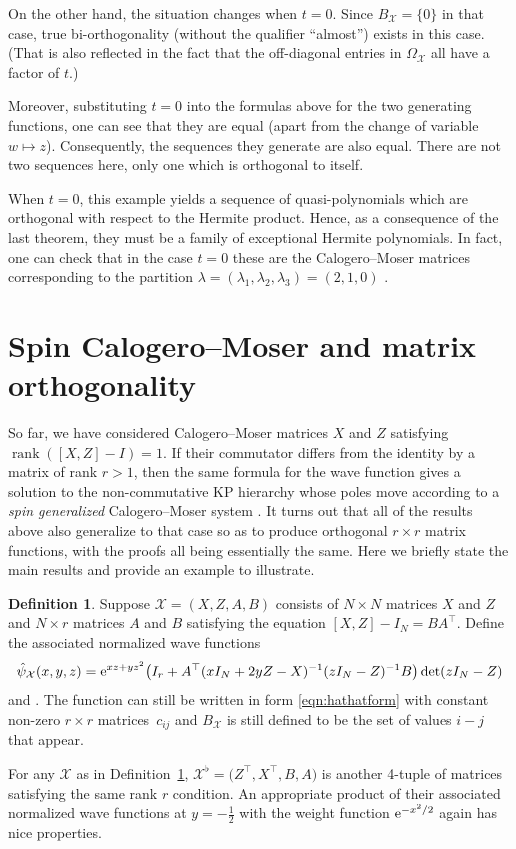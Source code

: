 \documentclass[pdftex]{sigma}
\numberwithin{equation}{section}
\theoremstyle{definition}
\newtheorem{Definition}[Theorem]{Definition}
\def\X{\mathcal{X}}
\begin{document}
On the other hand, the situation changes when $t=0$. Since
$B_{\X}=\{0\}$ in that case,
 true bi-orthogonality (without the qualifier ``almost'') exists
in this case. (That is also reflected in the fact that the
off-diagonal entries in $\Omega_{\X}$ all have a factor of $t$.)

Moreover, substituting $t=0$ into the formulas above for the two
generating functions, one can see that they are equal
(apart from the change of variable $w\mapsto z$). Consequently, the
sequences they generate are also equal. There are not two sequences
here, only one which is orthogonal to itself.

When $t=0$, this example yields a sequence of quasi-polynomials which are
orthogonal with respect to the Hermite product.
Hence, as a consequence of the last theorem, they must be a family of exceptional Hermite polynomials.
In fact, one can check that in the case $t=0$ these are the Calogero--Moser matrices
corresponding to the partition $\lambda=(\lambda_1,\lambda_2,\lambda_3)=(2,1,0)$ \cite{PThesis,PalusoKasman,WilsonCM}.

\section{Spin Calogero--Moser and matrix orthogonality}

So far, we have considered Calogero--Moser matrices $X$ and $Z$ satisfying
$\operatorname{rank}([X,Z]-I)=1$. If their commutator differs from the
identity by a matrix of rank $r>1$, then the same formula for the wave
function gives a solution to the non-commutative KP hierarchy whose
poles move according to a \textit{spin generalized} Calogero--Moser
system \cite{BGK}. It turns out that all of the results above also
generalize to that case so as to produce orthogonal $r\times r$ matrix
functions, with the proofs all being essentially the
same. Here we briefly state the main results and provide an example
to illustrate.

\begin{Definition}\label{def:spin}
Suppose $\X=(X,Z,A,B)$ consists of $N\times N$ matrices $X$ and $Z$
and $N\times r$ matrices $A$ and $B$ satisfying the equation
$[X,Z]-I_N=BA^{\top}$. Define the associated normalized wave
functions
\[
\hat\psi_{\X}(x,y,z)={\rm e}^{xz+yz^2}\bigl(I_r+A^\top(xI_N+2yZ-X)^{-1}(zI_N-Z)^{-1}B\bigr)\det(zI_N-Z)
 \]
 and
\smash{$
\hat{\hat\psi}_{\X}(x,y,z)=\hat\psi_{\X}(x,y,z)\det(xI_N+2yZ-X)$}.
The function \smash{$\hat{\hat\psi}_{\X}(x,0,z)$} can still be written in form
\eqref{eqn:hathatform} with constant non-zero $r\times r$ matrices~$c_{ij}$ and $B_{\X}$ is still defined to be the set of values $i-j$
that appear.
\end{Definition}
 For any $\X$ as in Definition~\ref{def:spin},
 $\X^{\flat}=\bigl(Z^\top,X^\top,B,A\bigr)$ is another 4-tuple of matrices
 satisfying the same rank $r$ condition. An appropriate product of their
 associated normalized wave functions at $y=-\tfrac{1}{2}$ with the weight
 function ${\rm e}^{-x^2/2}$ again has nice properties.
\end{document}
